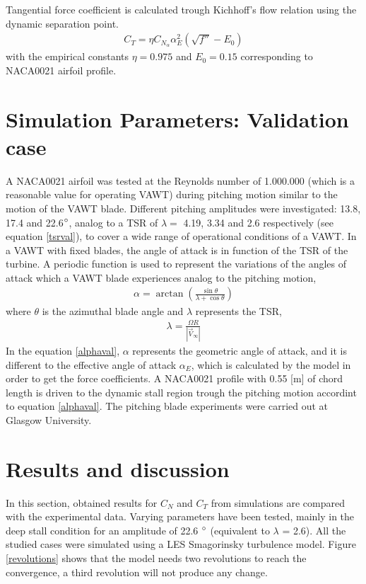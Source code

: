 \documentclass[a4paper]{jpconf}
\begin{document}
Tangential force coefficient is calculated trough Kichhoff's flow relation using the dynamic separation point.
\begin{align}
C_T = \eta C_{N_\alpha} \alpha_E ^2 ( \sqrt{f''}-E_0)     \label{CT}
\end{align}
with the empirical constants $\eta = 0.975$ and $E_0 = 0.15$ corresponding to NACA0021 airfoil profile.





\section{Simulation Parameters: Validation case}
A NACA0021 airfoil was tested at the Reynolds number of 1.000.000 (which is a
reasonable value for operating VAWT) during pitching motion similar to the motion
of the VAWT blade. Different pitching amplitudes were investigated: 13.8, 17.4 and 22.6$\degree$, analog to a TSR of $\lambda=$ 4.19, 3.34 and 2.6 respectively (see equation \ref{tsrval}), to cover a wide range of operational conditions of a VAWT.  In a VAWT with
fixed blades, the angle of attack is in function of the TSR of the turbine. A
periodic function is used to represent the variations of the angles of attack
which a VAWT blade experiences analog to the pitching motion,
\begin{eqnarray}
    \alpha = \arctan \left( \frac{\sin \theta}{\lambda + \cos \theta} \right) \label{alphaval}
\end{eqnarray}
where $\theta$ is the azimuthal blade angle and $ \lambda $ represents the TSR,
\begin{eqnarray}
    \lambda =  \frac{\Omega R}{ |\vec{V}_\infty | } \label{tsrval}
\end{eqnarray}
In the equation \ref{alphaval}, $\alpha$ represents the geometric angle of attack, and it is different to the effective angle of attack $\alpha_E$, which is calculated by the model in order to get the force coefficients. A NACA0021 profile with 0.55 [m] of chord length is driven to the dynamic stall region trough the pitching motion accordint to equation \ref{alphaval}. The pitching blade experiments were carried out at Glasgow
University\cite{angell1988collected}.



\section{Results and discussion}
In this section, obtained results for $C_N$ and $C_T$ from simulations are compared with the experimental data. Varying parameters have been tested, mainly in the deep stall condition for an amplitude of 22.6 $\degree $ (equivalent to $\lambda$ = 2.6). All the studied cases were simulated using a LES Smagorinsky turbulence model. Figure \ref{revolutions} shows that the model needs two revolutions to reach the convergence, a third revolution will not produce any change.
\end{document}
